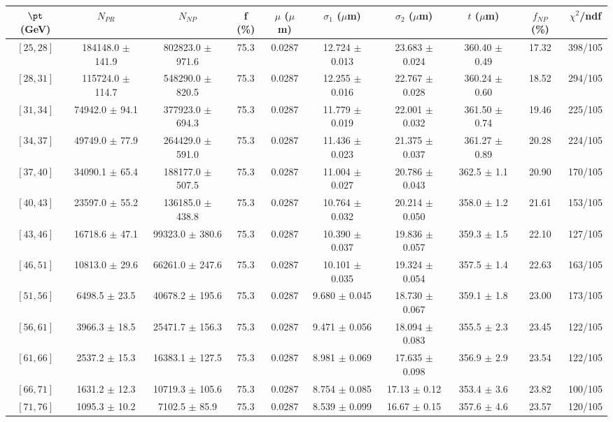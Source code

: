 \begin{tabular}{c||c|c|c|c|c|c|c||c|c}
$\pt$ (GeV) & $N_{PR}$ & $N_{NP}$ & f (\%) & $\mu$ ($\mu$m) & $\sigma_1$ ($\mu$m) & $\sigma_2$ ($\mu$m)  & $t$ ($\mu$m) & $f_{NP}$ (\%) & $\chi^2$/ndf \\
\hline
$[25, 28]$ & 184148.0 $\pm$ 141.9 & 802823.0 $\pm$ 971.6 & 75.3 & 0.0287 & 12.724 $\pm$ 0.013 & 23.683 $\pm$ 0.024 & 360.40 $\pm$ 0.49 & 17.32 & 398/105\\
$[28, 31]$ & 115724.0 $\pm$ 114.7 & 548290.0 $\pm$ 820.5 & 75.3 & 0.0287 & 12.255 $\pm$ 0.016 & 22.767 $\pm$ 0.028 & 360.24 $\pm$ 0.60 & 18.52 & 294/105\\
$[31, 34]$ & 74942.0 $\pm$ 94.1 & 377923.0 $\pm$ 694.3 & 75.3 & 0.0287 & 11.779 $\pm$ 0.019 & 22.001 $\pm$ 0.032 & 361.50 $\pm$ 0.74 & 19.46 & 225/105\\
$[34, 37]$ & 49749.0 $\pm$ 77.9 & 264429.0 $\pm$ 591.0 & 75.3 & 0.0287 & 11.436 $\pm$ 0.023 & 21.375 $\pm$ 0.037 & 361.27 $\pm$ 0.89 & 20.28 & 224/105\\
$[37, 40]$ & 34090.1 $\pm$ 65.4 & 188177.0 $\pm$ 507.5 & 75.3 & 0.0287 & 11.004 $\pm$ 0.027 & 20.786 $\pm$ 0.043 & 362.5 $\pm$ 1.1 & 20.90 & 170/105\\
$[40, 43]$ & 23597.0 $\pm$ 55.2 & 136185.0 $\pm$ 438.8 & 75.3 & 0.0287 & 10.764 $\pm$ 0.032 & 20.214 $\pm$ 0.050 & 358.0 $\pm$ 1.2 & 21.61 & 153/105\\
$[43, 46]$ & 16718.6 $\pm$ 47.1 & 99323.0 $\pm$ 380.6 & 75.3 & 0.0287 & 10.390 $\pm$ 0.037 & 19.836 $\pm$ 0.057 & 359.3 $\pm$ 1.5 & 22.10 & 127/105\\
$[46, 51]$ & 10813.0 $\pm$ 29.6 & 66261.0 $\pm$ 247.6 & 75.3 & 0.0287 & 10.101 $\pm$ 0.035 & 19.324 $\pm$ 0.054 & 357.5 $\pm$ 1.4 & 22.63 & 163/105\\
$[51, 56]$ & 6498.5 $\pm$ 23.5 & 40678.2 $\pm$ 195.6 & 75.3 & 0.0287 & 9.680 $\pm$ 0.045 & 18.730 $\pm$ 0.067 & 359.1 $\pm$ 1.8 & 23.00 & 173/105\\
$[56, 61]$ & 3966.3 $\pm$ 18.5 & 25471.7 $\pm$ 156.3 & 75.3 & 0.0287 & 9.471 $\pm$ 0.056 & 18.094 $\pm$ 0.083 & 355.5 $\pm$ 2.3 & 23.45 & 122/105\\
$[61, 66]$ & 2537.2 $\pm$ 15.3 & 16383.1 $\pm$ 127.5 & 75.3 & 0.0287 & 8.981 $\pm$ 0.069 & 17.635 $\pm$ 0.098 & 356.9 $\pm$ 2.9 & 23.54 & 122/105\\
$[66, 71]$ & 1631.2 $\pm$ 12.3 & 10719.3 $\pm$ 105.6 & 75.3 & 0.0287 & 8.754 $\pm$ 0.085 & 17.13 $\pm$ 0.12 & 353.4 $\pm$ 3.6 & 23.82 & 100/105\\
$[71, 76]$ & 1095.3 $\pm$ 10.2 & 7102.5 $\pm$ 85.9 & 75.3 & 0.0287 & 8.539 $\pm$ 0.099 & 16.67 $\pm$ 0.15 & 357.6 $\pm$ 4.6 & 23.57 & 120/105\\

\end{tabular}
